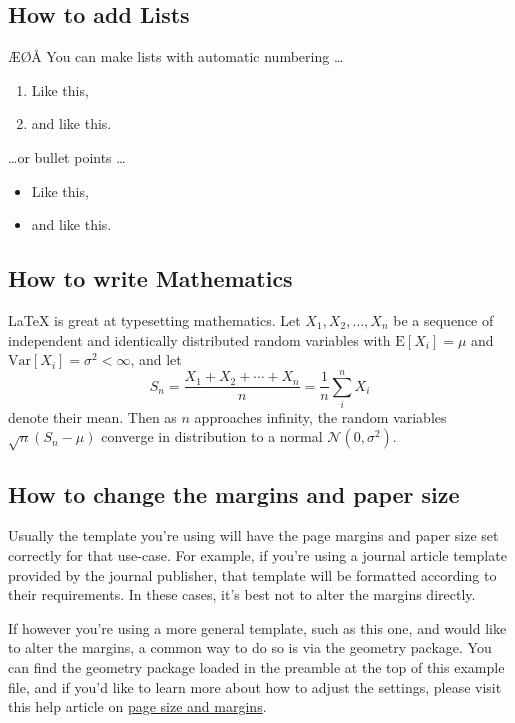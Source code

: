\documentclass{article}
\begin{document}
\subsection{How to add Lists}
ÆØÅ
You can make lists with automatic numbering \dots

\begin{enumerate}
\item Like this,
\item and like this.
\end{enumerate}
\dots or bullet points \dots
\begin{itemize}
\item Like this,
\item and like this.
\end{itemize}

\subsection{How to write Mathematics}

\LaTeX{} is great at typesetting mathematics. Let $X_1, X_2, \ldots, X_n$ be a sequence of independent and identically distributed random variables with $\text{E}[X_i] = \mu$ and $\text{Var}[X_i] = \sigma^2 < \infty$, and let
\[S_n = \frac{X_1 + X_2 + \cdots + X_n}{n}
      = \frac{1}{n}\sum_{i}^{n} X_i\]
denote their mean. Then as $n$ approaches infinity, the random variables $\sqrt{n}(S_n - \mu)$ converge in distribution to a normal $\mathcal{N}(0, \sigma^2)$.


\subsection{How to change the margins and paper size}

Usually the template you're using will have the page margins and paper size set correctly for that use-case. For example, if you're using a journal article template provided by the journal publisher, that template will be formatted according to their requirements. In these cases, it's best not to alter the margins directly.

If however you're using a more general template, such as this one, and would like to alter the margins, a common way to do so is via the geometry package. You can find the geometry package loaded in the preamble at the top of this example file, and if you'd like to learn more about how to adjust the settings, please visit this help article on \href{https://www.overleaf.com/learn/latex/page_size_and_margins}{page size and margins}.
\end{document}
